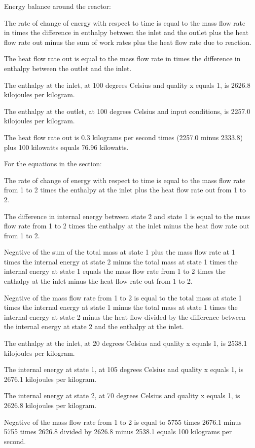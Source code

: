 Energy balance around the reactor:

The rate of change of energy with respect to time is equal to the mass flow rate in times the difference in enthalpy between the inlet and the outlet plus the heat flow rate out minus the sum of work rates plus the heat flow rate due to reaction.

The heat flow rate out is equal to the mass flow rate in times the difference in enthalpy between the outlet and the inlet.

The enthalpy at the inlet, at 100 degrees Celsius and quality x equals 1, is 2626.8 kilojoules per kilogram.

The enthalpy at the outlet, at 100 degrees Celsius and input conditions, is 2257.0 kilojoules per kilogram.

The heat flow rate out is 0.3 kilograms per second times (2257.0 minus 2333.8) plus 100 kilowatts equals 76.96 kilowatts.

For the equations in the section:

The rate of change of energy with respect to time is equal to the mass flow rate from 1 to 2 times the enthalpy at the inlet plus the heat flow rate out from 1 to 2.

The difference in internal energy between state 2 and state 1 is equal to the mass flow rate from 1 to 2 times the enthalpy at the inlet minus the heat flow rate out from 1 to 2.

Negative of the sum of the total mass at state 1 plus the mass flow rate at 1 times the internal energy at state 2 minus the total mass at state 1 times the internal energy at state 1 equals the mass flow rate from 1 to 2 times the enthalpy at the inlet minus the heat flow rate out from 1 to 2.

Negative of the mass flow rate from 1 to 2 is equal to the total mass at state 1 times the internal energy at state 1 minus the total mass at state 1 times the internal energy at state 2 minus the heat flow divided by the difference between the internal energy at state 2 and the enthalpy at the inlet.

The enthalpy at the inlet, at 20 degrees Celsius and quality x equals 1, is 2538.1 kilojoules per kilogram.

The internal energy at state 1, at 105 degrees Celsius and quality x equals 1, is 2676.1 kilojoules per kilogram.

The internal energy at state 2, at 70 degrees Celsius and quality x equals 1, is 2626.8 kilojoules per kilogram.

Negative of the mass flow rate from 1 to 2 is equal to 5755 times 2676.1 minus 5755 times 2626.8 divided by 2626.8 minus 2538.1 equals 100 kilograms per second.